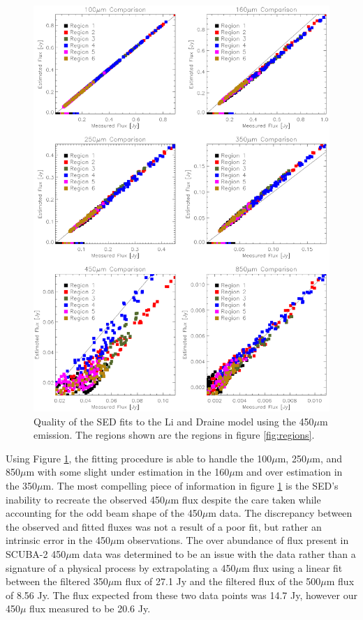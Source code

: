 \begin{figure}
  \centering
  \includegraphics[width=1.\textwidth]{sed_imgs/flux_compare_2_4.eps}
  \caption[Li and Draine Model SED Fit Quality Using 450$\mu$m Data]{Quality of the SED fits to the Li and Draine model using the 450$\mu$m emission.  The regions shown are the regions in figure \ref{fig:regions}.}
  \label{fig:w2_4}
\end{figure}

Using Figure \ref{fig:w2_4}, the fitting procedure is able to handle the 100$\mu$m, 250$\mu$m, and 850$\mu$m with some slight under estimation in the 160$\mu$m and over  estimation in the 350$\mu$m.  The most compelling piece of information in figure \ref{fig:w2_4} is the SED's inability to recreate the observed 450$\mu$m flux despite the care taken while accounting for the odd beam shape of the 450$\mu$m data.  The discrepancy between the observed and fitted fluxes was not a result of a poor fit, but rather an intrinsic error in the 450$\mu$m observations.  The over abundance of flux present in SCUBA-2 450$\mu$m data was determined to be an issue with the data rather than a signature of a physical process by extrapolating a 450$\mu$m flux using a linear fit between the filtered 350$\mu$m flux of 27.1 Jy and the filtered flux of the 500$\mu$m flux of 8.56 Jy.  The flux expected from these two data points was 14.7 Jy, however our 450$\mu$ flux measured to be 20.6 Jy.

